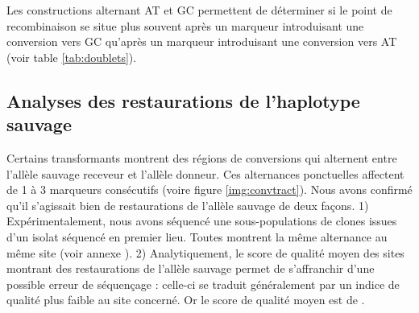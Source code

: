 Les constructions alternant AT et GC permettent de déterminer si le point de
recombinaison se situe plus souvent après un marqueur introduisant une
conversion vers GC qu'après un marqueur introduisant une conversion vers AT
(voir table \ref{tab:doublets}).



\subsection{Analyses des restaurations de l'haplotype sauvage}
\label{subsec:restaur}


Certains transformants montrent des régions de conversions qui alternent entre
l'allèle sauvage receveur et l'allèle donneur. Ces alternances ponctuelles
affectent de 1 à 3 marqueurs consécutifs (voire figure \ref{img:convtract}).
Nous avons confirmé qu'il s'agissait bien de restaurations de l'allèle sauvage
de deux façons. 1) Expérimentalement, nous avons séquencé une
sous-populations de clones issues d'un isolat séquencé en premier lieu. Toutes
montrent la même alternance au même site (voir annexe
). 2) Analytiquement, le score de qualité moyen des sites montrant des
restaurations de l'allèle sauvage permet de s'affranchir d'une possible erreur
de séquençage : celle-ci se traduit généralement par un indice de qualité plus
faible au site concerné. Or le score de qualité moyen est de
.

